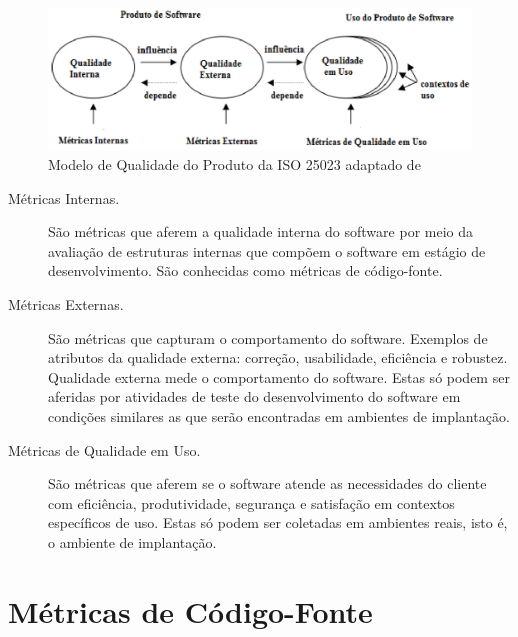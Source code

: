 				
\begin{figure}[h!]
\centering
\includegraphics[keepaspectratio=false,scale=1]{figuras/modelodequalidade.eps}
\caption{Modelo de Qualidade do Produto da ISO 25023 adaptado de 
}
\label{modelodequalidade}
\end{figure}
\FloatBarrier
	
\begin{description}
		\item[Métricas Internas.] 
		São métricas que aferem a qualidade interna do software por meio da 
		avaliação de estruturas internas que compõem o software em estágio de 
		desenvolvimento. São conhecidas como métricas de código-fonte.

		\item[Métricas Externas.]
		São métricas que capturam o comportamento do software. Exemplos de 
		atributos da qualidade externa: correção, usabilidade, eficiência e 
		robustez. Qualidade externa mede o comportamento do software. Estas só 
		podem ser aferidas por atividades de teste do desenvolvimento do 
		software em condições similares as que serão encontradas em ambientes de
		implantação.

		\item[Métricas de Qualidade em Uso.]
		 São métricas que aferem se o software atende as necessidades do cliente
		 com eficiência, produtividade, segurança e satisfação em contextos 
		 específicos de uso. Estas só podem ser coletadas em ambientes reais, 
		 isto é, o ambiente de implantação.
			 
\end{description}
		
				

\section {Métricas de Código-Fonte}
\label{Métricas de Código-Fonte}

